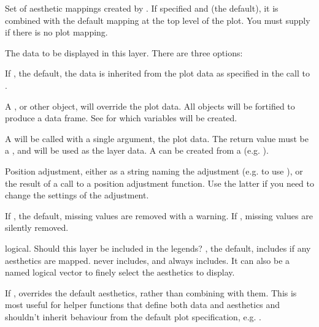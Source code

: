 \documentclass[a4paper]{book}
\begin{document}
\begin{Arguments}
\begin{ldescription}
\item[\code{mapping}] Set of aesthetic mappings created by . If specified and
 (the default), it is combined with the default mapping
at the top level of the plot. You must supply  if there is no plot
mapping.

\item[\code{data}] The data to be displayed in this layer. There are three
options:

If , the default, the data is inherited from the plot
data as specified in the call to .

A , or other object, will override the plot
data. All objects will be fortified to produce a data frame. See
 for which variables will be created.

A  will be called with a single argument,
the plot data. The return value must be a , and
will be used as the layer data. A  can be created
from a  (e.g. ).

\item[\code{position}] Position adjustment, either as a string naming the adjustment
(e.g.  to use ), or the result of a call to a
position adjustment function. Use the latter if you need to change the
settings of the adjustment.

\item[\code{na.rm}] If , the default, missing values are removed with
a warning. If , missing values are silently removed.

\item[\code{show.legend}] logical. Should this layer be included in the legends?
, the default, includes if any aesthetics are mapped.
 never includes, and  always includes.
It can also be a named logical vector to finely select the aesthetics to
display.

\item[\code{inherit.aes}] If , overrides the default aesthetics,
rather than combining with them. This is most useful for helper functions
that define both data and aesthetics and shouldn't inherit behaviour from
the default plot specification, e.g. .


\end{ldescription}
\end{Arguments}
\end{document}
